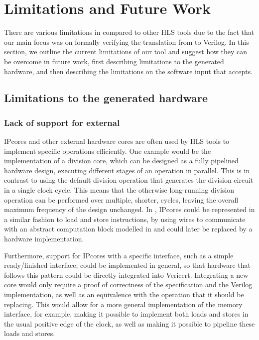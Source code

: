 \section{Limitations and Future Work}

There are various limitations in \vericert{} compared to other HLS tools due to
the fact that our main focus was on formally verifying the translation from
\rtl{} to Verilog.  In this section, we outline the current limitations of our
tool and suggest how they can be overcome in future work, first describing
limitations to the generated hardware, and then describing the limitations on
the software input that \vericert{} accepts.

\subsection{Limitations to the generated hardware}

\subsubsection{Lack of support for external }

\glspl{IPcore} and other external hardware cores are often used by \gls{HLS}
tools to implement specific operations efficiently.  One example would be the
implementation of a division core, which can be designed as a fully pipelined
hardware design, executing different stages of an operation in parallel.  This
is in contrast to using the default division operation that generates the
division circuit in a single clock cycle.  This means that the otherwise
long-running division operation can be performed over multiple, shorter, cycles,
leaving the overall maximum frequency of the design unchanged.  In \htl{},
\glspl{IPcore} could be represented in a similar fashion to load and store
instructions, by using wires to communicate with an abstract computation block
modelled in \htl{} and could later be replaced by a hardware implementation.

Furthermore, support for \glspl{IPcore} with a specific interface, such as a
simple ready/finished interface, could be implemented in general, so that
hardware that follows this pattern could be directly integrated into Vericert.
Integrating a new core would only require a proof of correctness of the
specification and the Verilog implementation, as well as an equivalence with the
operation that it should be replacing.  This would allow for a more general
implementation of the memory interface, for example, making it possible to
implement both loads and stores in the usual positive edge of the clock, as well
as making it possible to pipeline these loads and stores.

